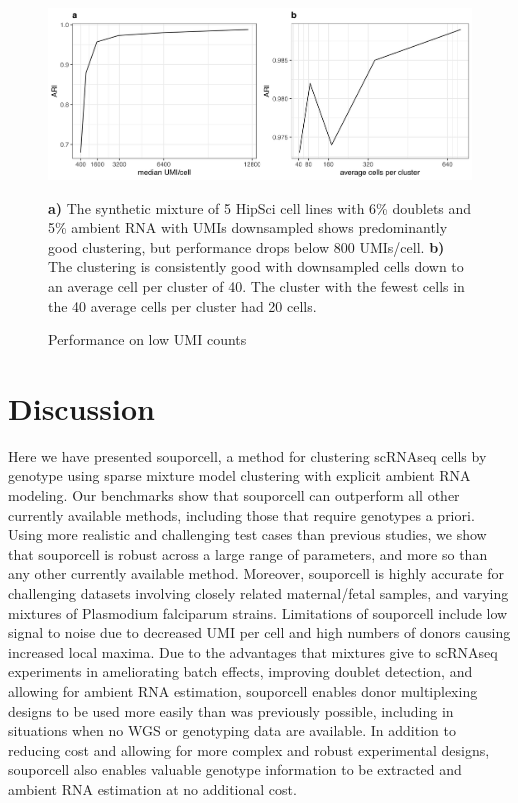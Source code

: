 \begin{figure}[htbp!]
\caption{Performance on low UMI counts}
\label{figure:umidown}
\begin{centering}

\includegraphics[width=\textwidth]{umidown.jpg} 
\par{\textbf{a)} The synthetic mixture of 5 HipSci cell lines with 6\% doublets and 5\% ambient RNA with UMIs downsampled shows predominantly
good clustering, but performance drops below 800 UMIs/cell. \textbf{b)} The clustering is consistently good with downsampled cells down to an
average cell per cluster of 40. The cluster with the fewest cells in the 40 average cells per cluster had 20 cells.}

\end{centering}
\end{figure}




\section{Discussion}
\par{
Here we have presented souporcell, a method for clustering scRNAseq cells by genotype using sparse mixture model clustering with explicit ambient RNA modeling. Our benchmarks show that souporcell can outperform all other currently available methods, including those that require genotypes a priori. Using more realistic and challenging test cases than previous studies, we show that souporcell is robust across a large range of parameters, and more so than any other currently available method. Moreover, souporcell is highly accurate for challenging datasets involving closely related maternal/fetal samples, and varying mixtures of Plasmodium falciparum strains. Limitations of souporcell include low signal to noise due to decreased UMI per cell and high numbers of donors causing increased local maxima. Due to the advantages that mixtures give to scRNAseq experiments in ameliorating batch effects, improving doublet detection, and allowing for ambient RNA estimation, souporcell enables donor multiplexing designs to be used more easily than was previously possible, including in situations when no WGS or genotyping data are available. In addition to reducing cost and allowing for more complex and robust experimental designs, souporcell also enables valuable genotype information to be extracted and ambient RNA estimation at no additional cost.
}


